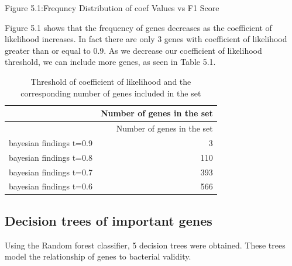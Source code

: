 \documentclass[]{report}
\begin{document}
\begin{center} Figure 5.1:Frequncy Distribution of coef Values vs F1 Score \end{center}

Figure 5.1 shows that the frequency of genes decreases as the
coefficient of likelihood increases. In fact there are only 3 genes with
coefficient of likelihood greater than or equal to 0.9. As we decrease
our coefficient of likelihood threshold, we can include more genes, as
seen in Table 5.1.

\begin{longtable}[]{@{}lr@{}}
\caption{Threshold of coefficient of likelihood and the corresponding
number of genes included in the set}\tabularnewline
\toprule
\begin{minipage}[b]{0.48\columnwidth}\raggedright\strut
\strut
\end{minipage} & \begin{minipage}[b]{0.48\columnwidth}\raggedleft\strut
Number of genes in the set\strut
\end{minipage}\tabularnewline
\midrule
\endfirsthead
\toprule
\begin{minipage}[b]{0.48\columnwidth}\raggedright\strut
\strut
\end{minipage} & \begin{minipage}[b]{0.48\columnwidth}\raggedleft\strut
Number of genes in the set\strut
\end{minipage}\tabularnewline
\midrule
\endhead
bayesian findings t=0.9 & 3\tabularnewline
bayesian findings t=0.8 & 110\tabularnewline
bayesian findings t=0.7 & 393\tabularnewline
bayesian findings t=0.6 & 566\tabularnewline
\bottomrule
\end{longtable}

\subsection{Decision trees of important
genes}\label{decision-trees-of-important-genes}

Using the Random forest classifier, 5 decision trees were obtained.
These trees model the relationship of genes to bacterial validity.
\end{document}
